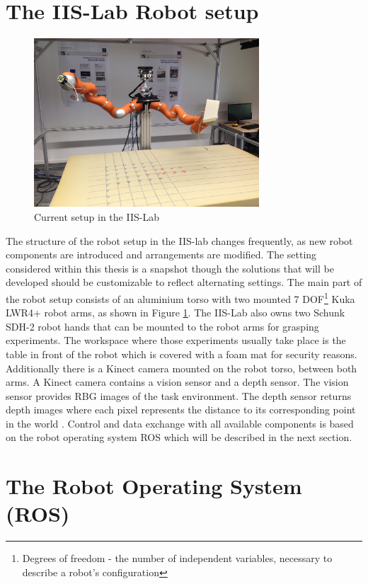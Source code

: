 \section{The IIS-Lab Robot setup}
\begin{figure}[ht]
	\centering
  \includegraphics[width=0.75\textwidth]{images/robot_setup.jpg}
	\caption{Current setup in the IIS-Lab}
	\label{fig:iis_setup}
\end{figure}

The structure of the robot setup in the IIS-lab changes frequently, as new robot components are introduced and arrangements are modified. The setting considered within this thesis is a snapshot though the solutions that will be developed should be customizable to reflect alternating settings. The main part of the robot setup consists of an aluminium torso with two mounted 7 DOF\footnote{Degrees of freedom - the number of independent variables, necessary to describe a robot's configuration} Kuka LWR4+ \citep{kuka2012} robot arms, as shown in Figure \ref{fig:iis_setup}. The IIS-Lab also owns two Schunk SDH-2 \citep{schunk2010} robot hands that can be mounted to the robot arms for grasping experiments. The workspace where those experiments usually take place is the table in front of the robot which is covered with a foam mat for security reasons. Additionally there is a Kinect camera mounted on the robot torso, between both arms. A Kinect camera contains a vision sensor and a depth sensor. The vision sensor provides RBG images of the task environment. The depth sensor returns depth images where each pixel represents the distance to its corresponding point in the world \citep{andersen2012}. Control and data exchange with all available components is based on the robot operating system ROS which will be described in the next section.

\section{The Robot Operating System (ROS)}

